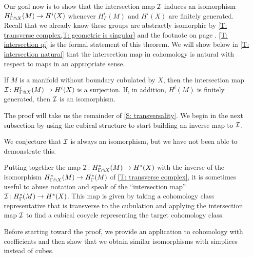 Our goal now is to show that the intersection map $\mathcal{I}$ induces an isomorphism $H^i_{\Gamma \pitchfork X}(M) \to H^i(X)$ whenever $H^i_\Gamma(M)$ and $H^i(X)$ are finitely generated.
Recall that we already know these groups are abstractly isomorphic by \cref{T: transverse complex,T: geometric is singular} and the footnote on page \pageref{FN: cubical and singular}.
\cref{T: intersection qi} is the formal statement of this theorem.
We will show below in \cref{T: intersection natural} that the intersection map in cohomology is natural with respect to maps in an appropriate sense.

\begin{theorem}\label{T: intersection qi}
	If $M$ is a manifold without boundary cubulated by $X$, then the intersection map $\mathcal{I} \colon H^i_{\Gamma \pitchfork X}(M) \to H^i(X)$ is a surjection.
	If, in addition, $H^i(M)$ is finitely generated, then $\mathcal{I}$ is an isomorphism.
\end{theorem}


The proof will take us the remainder of \cref{S: transversality}.
We begin in the next subsection by using the cubical structure to start building an inverse map to $\mathcal{I}$.

We conjecture that $\mathcal{I}$ is always an isomorphism, but we have not been able to demonstrate this.


\begin{remark}\label{R: intersection map extension}
	Putting together the map $\mathcal{I} \colon H^*_{\Gamma \pitchfork X}(M) \to H^*(X)$ with the inverse of the isomorphism $H^*_{\Gamma \pitchfork X}(M) \to H^*_\Gamma(M)$ of \cref{T: transverse complex}, it is sometimes useful to abuse notation and speak of the ``intersection map'' $\mathcal{I} \colon H^*_\Gamma(M) \to H^*(X)$.
	This map is given by taking a cohomology class representative that is transverse to the cubulation and applying the intersection map $\mathcal{I}$ to find a cubical cocycle representing the target cohomology class.
\end{remark}

Before starting toward the proof, we provide an application to cohomology with coefficients and then show that we obtain similar isomorphisms with simplices instead of cubes.

